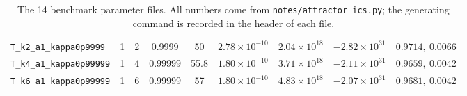 \documentclass[11pt,a4paper]{article}
\newcommand{\file}[1]{\texttt{#1}}
\begin{document}
\begin{table}[h!]
{\begin{tabular}{@{}l c c c c c c c c@{}}
\file{T\_k2\_a1\_kappa0p9999}  & 1 & 2  & 0.9999  & 50   & $2.78\times10^{-10}$ & $2.04\times10^{18}$ & $-2.82\times10^{31}$ & $0.9714,\ 0.0066$ \\
\file{T\_k4\_a1\_kappa0p99999} & 1 & 4  & 0.99999 & 55.8 & $1.80\times10^{-10}$ & $3.71\times10^{18}$ & $-2.11\times10^{31}$ & $0.9659,\ 0.0042$ \\
\file{T\_k6\_a1\_kappa0p99999} & 1 & 6  & 0.99999 & 57   & $1.80\times10^{-10}$ & $4.83\times10^{18}$ & $-2.07\times10^{31}$ & $0.9681,\ 0.0042$ \\
\bottomrule
\end{tabular}}
\caption{The 14 benchmark parameter files. All numbers come from \file{notes/attractor\_ics.py}; the generating command is recorded in the header of each file.}
\label{tab:bench}
\end{table}

\end{document}
